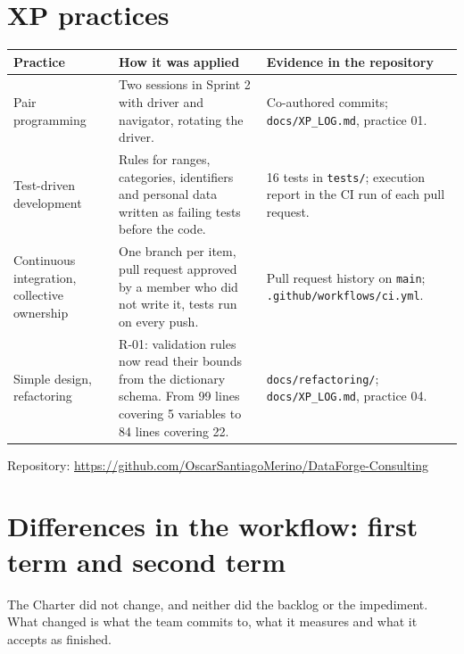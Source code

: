 \documentclass[10pt,a4paper]{article}
\newcommand{\repourl}{https://github.com/OscarSantiagoMerino/DataForge-Consulting}
\begin{document}
\section{XP practices}
{\footnotesize
\begin{tabularx}{\linewidth}{@{}l L L@{}}
\toprule
Practice & How it was applied & Evidence in the repository \\
\midrule
Pair programming & Two sessions in Sprint 2 with driver and navigator, rotating the driver. & Co-authored commits; \texttt{docs/XP\_LOG.md}, practice 01. \\
Test-driven development & Rules for ranges, categories, identifiers and personal data written as failing tests before the code. & 16 tests in \texttt{tests/}; execution report in the CI run of each pull request. \\
Continuous integration, collective ownership & One branch per item, pull request approved by a member who did not write it, tests run on every push. & Pull request history on \texttt{main}; \texttt{.github/workflows/ci.yml}. \\
Simple design, refactoring & R-01: validation rules now read their bounds from the dictionary schema. From 99 lines covering 5 variables to 84 lines covering 22. & \texttt{docs/refactoring/}; \texttt{docs/XP\_LOG.md}, practice 04. \\
\bottomrule
\end{tabularx}}

Repository: \url{\repourl}

\section{Differences in the workflow: first term and second term}
The Charter did not change, and neither did the backlog or the impediment. What changed is what the team
commits to, what it measures and what it accepts as finished.
\end{document}
